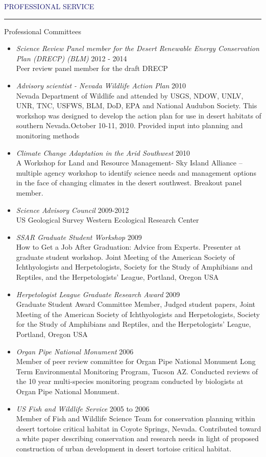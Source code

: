 \documentclass{resume} %
\renewenvironment{rSection}[1]{
\sectionskip
\textcolor{MidnightBlue}{\MakeUppercase{#1}}
\sectionlineskip
\hrule
\begin{list}{}{
\setlength{\leftmargin}{1.5em}
}
\item[]
}{
\end{list}
}
\begin{document}
\begin{rSection}{Professional Service}
\begin{rSubsection}{Professional Committees}{}{}{}
\begin{itemize}
\item \textit{Science Review Panel member for the Desert Renewable Energy Conservation Plan (DRECP) (BLM)} \hfill 2012 - 2014\\
Peer review panel member for the draft DRECP

\item \textit{Advisory scientist - Nevada Wildlife Action Plan} \hfill 2010 \\
Nevada Department of Wildlife and attended by USGS, NDOW, UNLV, UNR, TNC, USFWS, BLM, DoD, EPA and National Audubon Society. This workshop was designed to develop the action plan for use in desert habitats of southern Nevada.October 10-11, 2010. Provided input into planning and monitoring methods 
\item \textit{Climate Change Adaptation in the Arid Southwest} \hfill 2010 \\ 
A Workshop for Land and Resource Management- Sky Island Alliance – multiple agency workshop to identify science needs and management options in the face of changing climates in the desert southwest. Breakout panel member.
\item \textit{Science Advisory Council} \hfill 2009-2012 \\
 US Geological Survey Western Ecological Research Center
\item \textit{SSAR Graduate Student Workshop} \hfill 2009 \\ 
How to Get a Job After Graduation: Advice from Experts. Presenter at graduate student workshop. Joint Meeting of the American Society of Ichthyologists and Herpetologists, Society for the Study of Amphibians and Reptiles, and the Herpetologists' League, Portland, Oregon USA
\item \textit{Herpetologist League Graduate Research Award} \hfill 2009 \\ 
Graduate Student Award Committee Member, Judged student papers, Joint Meeting of the American Society of Ichthyologists and Herpetologists, Society for the Study of Amphibians and Reptiles, and the Herpetologists' League, Portland, Oregon USA
\item \textit{Organ Pipe National Monument} \hfill 2006 \\
Member of peer review committee for Organ Pipe National Monument Long Term Environmental Monitoring Program, Tucson AZ. Conducted reviews of the 10 year multi-species monitoring program conducted by biologists at Organ Pipe National Monument.
\item \textit{US Fish and Wildlife Service} \hfill 2005 to 2006 \\ Member of Fish and Wildlife Science Team for conservation planning within desert tortoise critical habitat in Coyote Springs, Nevada. Contributed toward a white paper describing conservation and research needs in light of proposed construction of urban development in desert tortoise critical habitat.

\end{itemize}
\end{rSubsection}
\end{rSection}
\end{document}
